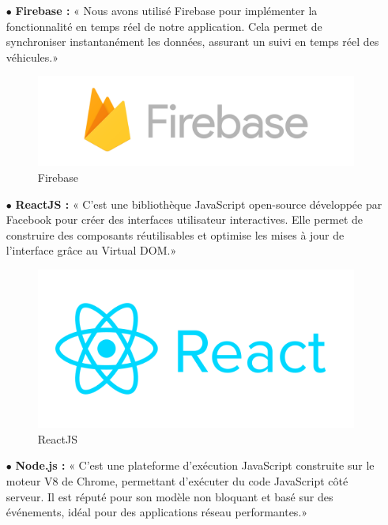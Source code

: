 \begin{itemize}
    \item[$\bullet$] \textbf{ Firebase :}
          « Nous avons utilisé Firebase pour implémenter la fonctionnalité en temps réel de notre application. Cela permet de synchroniser instantanément les données, assurant un suivi en temps réel des véhicules.»

          \begin{figure}[H]
              \centering \includegraphics[scale=0.16]{chap1.images/firebase.png}
              \caption{Firebase}

          \end{figure}


    \item[$\bullet$] \textbf{ ReactJS :}
          « C'est une bibliothèque JavaScript open-source développée par Facebook pour créer des interfaces utilisateur interactives. Elle permet de construire des composants réutilisables et optimise les mises à jour de l'interface grâce au Virtual DOM.»

          \begin{figure}[ht]
              \centering \includegraphics[scale=0.28]{chap1.images/reactjs_logo.png}
              \caption{ReactJS}

          \end{figure}

    \item[$\bullet$] \textbf{ Node.js :}
          « C'est une plateforme d'exécution JavaScript construite sur le moteur V8 de Chrome, permettant d'exécuter du code JavaScript côté serveur. Il est réputé pour son modèle non bloquant et basé sur des événements, idéal pour des applications réseau performantes.»


\end{itemize}
